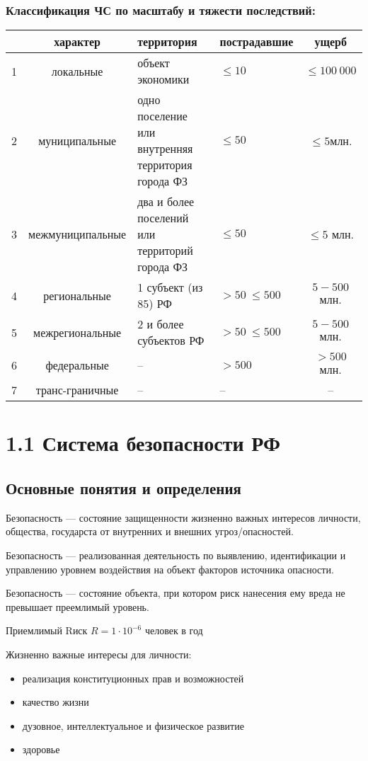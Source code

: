 \textsl{}\documentclass[oneside,final,14pt]{extreport}
\begin{document}
\subsection*{Классификация ЧС по масштабу и тяжести последствий:}
\begin{table}[h]
	\begin{tabular}{|r|c|p{}|p{}|c|}
		\hline \textnumero & характер & территория & пострадавшие & ущерб \\
		\hline 1 & локальные & объект экономики & $\le10$ & $\le100\ 000$ \\
		\hline 2 & муниципальные &одно поселение или внутренняя территория города ФЗ & $\le50$ & $\le5$млн. \\
		\hline 3 & межмуниципальные & два и более поселений или территорий города ФЗ & $\le50$ & $\le5$ млн. \\
		\hline 4 & региональные & 1 субъект (из 85) РФ & $>50\ \le500$ & $5-500$ млн. \\
		\hline 5 & межрегиональные & 2 и более субъектов РФ & $>50\ \le500$ & $5-500$ млн. \\
		\hline 6 & федеральные & -- & $>500$ & $>500$ млн. \\
		\hline 7 & транс-граничные & -- & -- & -- \\
		\hline
	\end{tabular}
\end{table}


\chapter*{1.1 Система безопасности РФ}
\section*{Основные понятия и определения}

Безопасность --- состояние защищенности жизненно важных интересов личности, общества, государста от внутренних и внешних угроз/опасностей.

Безопасность --- реализованная деятельность по выявлению, идентификации и управлению уровнем воздействия на объект факторов источника опасности.

Безопасность --- состояние объекта, при котором риск нанесения ему вреда не превышает преемлимый уровень.

Приемлимый Rиск $R=1\cdot 10^{-6}$ человек в год

Жизненно важные интересы для личности:
\begin{itemize}
	\item реализация конституционных прав и возможностей
	\item качество жизни
	\item дузовное, интеллектуальное и физическое развитие
	\item здоровье
\end{itemize}
\end{document}
